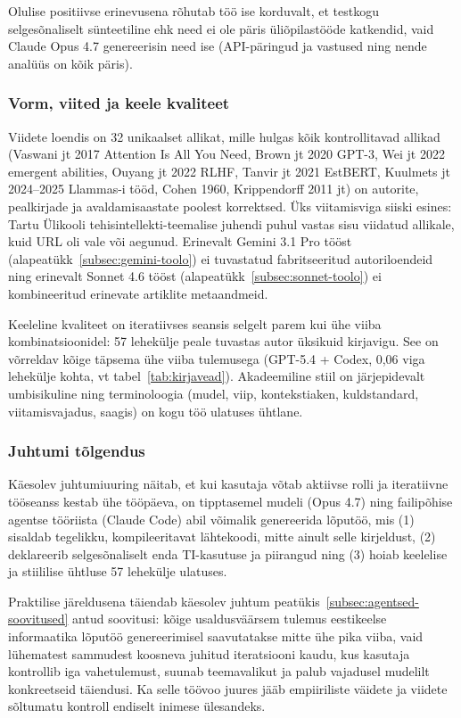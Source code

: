 Olulise positiivse erinevusena rõhutab töö ise korduvalt, et testkogu selgesõnaliselt sünteetiline ehk need ei ole päris üliõpilastööde katkendid, vaid Claude Opus 4.7 genereerisin need ise (API-päringud ja vastused ning nende analüüs on kõik päris).

\subsubsection{Vorm, viited ja keele kvaliteet}

Viidete loendis on 32 unikaalset allikat, mille hulgas kõik kontrollitavad allikad (Vaswani jt 2017 Attention Is All You Need, Brown jt 2020 GPT-3, Wei jt 2022 emergent abilities, Ouyang jt 2022 RLHF, Tanvir jt 2021 EstBERT, Kuulmets jt 2024--2025 Llammas-i tööd, Cohen 1960, Krippendorff 2011 jt) on autorite, pealkirjade ja avaldamisaastate poolest korrektsed. Üks viitamisviga siiski esines: Tartu Ülikooli tehisintellekti-teemalise juhendi puhul vastas sisu viidatud allikale, kuid URL oli vale või aegunud. Erinevalt Gemini 3.1 Pro tööst (alapeatükk~\ref{subsec:gemini-toolo}) ei tuvastatud fabritseeritud autoriloendeid ning erinevalt Sonnet 4.6 tööst (alapeatükk~\ref{subsec:sonnet-toolo}) ei kombineeritud erinevate artiklite metaandmeid.

Keeleline kvaliteet on iteratiivses seansis selgelt parem kui ühe viiba kombinatsioonidel: 57 lehekülje peale tuvastas autor üksikuid kirjavigu. See on võrreldav kõige täpsema ühe viiba tulemusega (GPT-5.4 + Codex, 0,06 viga lehekülje kohta, vt tabel~\ref{tab:kirjavead}). Akadeemiline stiil on järjepidevalt umbisikuline ning terminoloogia (mudel, viip, kontekstiaken, kuldstandard, viitamisvajadus, saagis) on kogu töö ulatuses ühtlane.

\subsubsection{Juhtumi tõlgendus}

Käesolev juhtumiuuring näitab, et kui kasutaja võtab aktiivse rolli ja iteratiivne tööseanss kestab ühe tööpäeva, on tipptasemel mudeli (Opus 4.7) ning failipõhise agentse tööriista (Claude Code) abil võimalik genereerida lõputöö, mis (1) sisaldab tegelikku, kompileeritavat lähtekoodi, mitte ainult selle kirjeldust, (2) deklareerib selgesõnaliselt enda TI-kasutuse ja piirangud ning (3) hoiab keelelise ja stiililise ühtluse 57 lehekülje ulatuses.

Praktilise järeldusena täiendab käesolev juhtum peatükis~\ref{subsec:agentsed-soovitused} antud soovitusi: kõige usaldusväärsem tulemus eestikeelse informaatika lõputöö genereerimisel saavutatakse mitte ühe pika viiba, vaid lühematest sammudest koosneva juhitud iteratsiooni kaudu, kus kasutaja kontrollib iga vahetulemust, suunab teemavalikut ja palub vajadusel mudelilt konkreetseid täiendusi. Ka selle töövoo juures jääb empiiriliste väidete ja viidete sõltumatu kontroll endiselt inimese ülesandeks.
